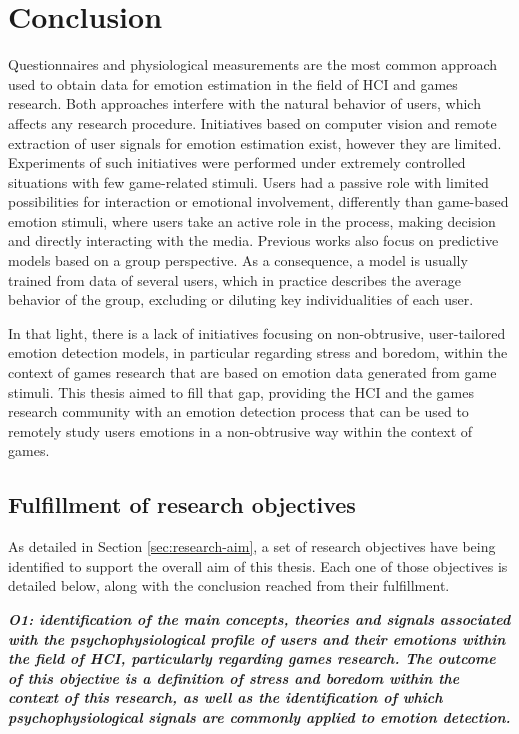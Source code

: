 \chapter{Conclusion}
\label{ch:conclusion}

Questionnaires and physiological measurements are the most common approach used to obtain data for emotion estimation in the field of HCI and games research. Both approaches interfere with the natural behavior of users, which affects any research procedure. Initiatives based on computer vision and remote extraction of user signals for emotion estimation exist, however they are limited. Experiments of such initiatives were performed under extremely controlled situations with few game-related stimuli. Users had a passive role with limited possibilities for interaction or emotional involvement, differently than game-based emotion stimuli, where users take an active role in the process, making decision and directly interacting with the media. Previous works also focus on predictive models based on a group perspective. As a consequence, a model is usually trained from data of several users, which in practice describes the average behavior of the group, excluding or diluting key individualities of each user.

In that light, there is a lack of initiatives focusing on non-obtrusive, user-tailored emotion detection models, in particular regarding stress and boredom, within the context of games research that are based on emotion data generated from game stimuli. This thesis aimed to fill that gap, providing the HCI and the games research community with an emotion detection process that can be used to remotely study users emotions in a non-obtrusive way within the context of games.

\section{Fulfillment of research objectives}

As detailed in Section \ref{sec:research-aim}, a set of research objectives have being identified to support the overall aim of this thesis. Each one of those objectives is detailed below, along with the conclusion reached from their fulfillment.

\textit{\textbf{O1: identification of the main concepts, theories and signals associated with the psychophysiological profile of users and their emotions within the field of HCI, particularly regarding games research. The outcome of this objective is a definition of stress and boredom within the context of this research, as well as the identification of which psychophysiological signals are commonly applied to emotion detection.}}

